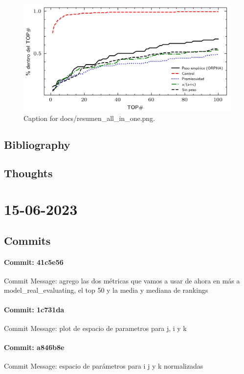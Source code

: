 \documentclass{article}
\begin{document}
\begin{figure}[h] \centering \includegraphics{docs/resumen_all_in_one.png} \caption{Caption for docs/resumen_all_in_one.png.} \end{figure}
\subsection{Bibliography}
\subsection{Thoughts}

\section{15-06-2023}
\subsection{Commits}
\paragraph{Commit: 41c5e56}
Commit Message: agrego las dos métricas que vamos a usar de ahora en más a model_real_evaluating, el top 50 y la media y mediana de rankings

\paragraph{Commit: 1c731da}
Commit Message: plot de espacio de parametros para j, i y k

\paragraph{Commit: a846b8e}
Commit Message: espacio de parámetros para i j y k normalizadas
\end{document}
